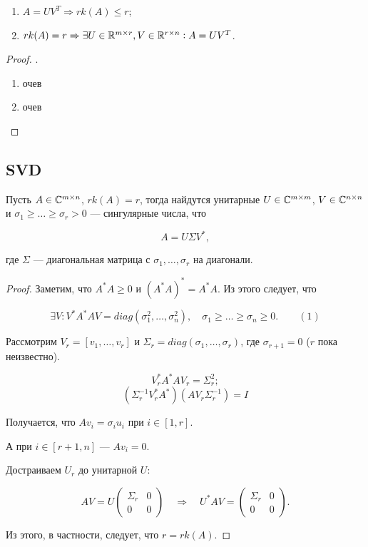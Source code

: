 \begin{enumerate}
    \item $A = U V^T \Rightarrow rk(A) \le r$;
    \item $rk(A) = r \Rightarrow \exists U \in \mathbb{R}^{m \times r},
        V \in \mathbb{R}^{r \times n}: A = U V^T$.
\end{enumerate}

\begin{proof} .

    \begin{enumerate}
        \item очев
        \item очев
    \end{enumerate}
\end{proof}

\subsection{SVD}

\begin{theorem}
    Пусть $A \in \mathbb{C}^{m \times n}$, $rk(A) = r$, тогда найдутся унитарные
    $U \in \mathbb{C}^{m \times m}$, $V \in \mathbb{C}^{n \times n}$ и
    $\sigma_1 \ge \dots \ge \sigma_r > 0$ --- сингулярные числа, что

    \[
        A = U \Sigma V^*,
    \]

    где $\Sigma$ --- диагональная матрица с $\sigma_1, \dots, \sigma_r$ на
    диагонали.
\end{theorem}

\begin{proof}
    Заметим, что $A^* A \ge 0$ и $(A^* A)^* = A^* A$. Из этого следует, что

    \[
        \exists V: V^* A^* A V = diag(\sigma_1^2, \dots, \sigma_n^2),
        \quad \sigma_1 \ge \dots \ge \sigma_n \ge 0. \qquad (1)
    \]

    Рассмотрим $V_r = [v_1, \dots, v_r]$ и
    $\Sigma_r = diag(\sigma_1, \dots, \sigma_r)$, где $\sigma_{r + 1} = 0$
    ($r$ пока неизвестно).

    \[
        V_r^* A^* A V_r = \Sigma_r^2;
    \]
    \[
        \left( \Sigma_r^{-1} V_r^* A^* \right)
        \left( A V_r \Sigma_r^{-1} \right) = I
    \]

    Получается, что $A v_i = \sigma_i u_i$ при $i \in [1, r]$.

    А при $i \in [r + 1, n]$ --- $A v_i = 0$.

    Достраиваем $U_r$ до унитарной $U$:

    \[
        A V = U \begin{pmatrix} \Sigma_r & 0 \\ 0 & 0 \end{pmatrix}
        \quad\Rightarrow\quad
        U^* A V = \begin{pmatrix} \Sigma_r & 0 \\ 0 & 0 \end{pmatrix}.
    \]

    Из этого, в частности, следует, что $r = rk(A)$.
\end{proof}

